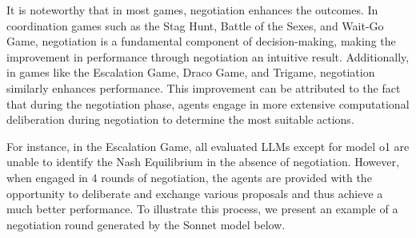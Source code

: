It is noteworthy that in most games, negotiation enhances the outcomes. In coordination games such as the Stag Hunt, Battle of the Sexes, and Wait-Go Game, negotiation is a fundamental component of decision-making, making the improvement in performance through negotiation an intuitive result. Additionally, in games like the Escalation Game, Draco Game, and Trigame, negotiation similarly enhances performance. This improvement can be attributed to the fact that during the negotiation phase, agents engage in more extensive computational deliberation during negotiation to determine the most suitable actions.

For instance, in the Escalation Game, all evaluated LLMs except for model o1 are unable to identify the Nash Equilibrium in the absence of negotiation. However, when engaged in 4 rounds of negotiation, the agents are provided with the opportunity to deliberate and exchange various proposals and thus achieve a much better performance. To illustrate this process, we present an example of a negotiation round generated by the Sonnet model below.

